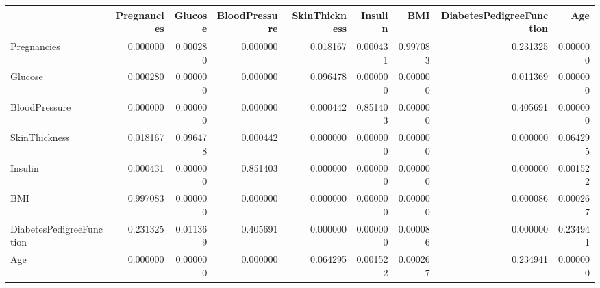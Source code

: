 \begin{tabular}{lrrrrrrrr}
\toprule
 & Pregnancies & Glucose & BloodPressure & SkinThickness & Insulin & BMI & DiabetesPedigreeFunction & Age \\
\midrule
Pregnancies & 0.000000 & 0.000280 & 0.000000 & 0.018167 & 0.000431 & 0.997083 & 0.231325 & 0.000000 \\
Glucose & 0.000280 & 0.000000 & 0.000000 & 0.096478 & 0.000000 & 0.000000 & 0.011369 & 0.000000 \\
BloodPressure & 0.000000 & 0.000000 & 0.000000 & 0.000442 & 0.851403 & 0.000000 & 0.405691 & 0.000000 \\
SkinThickness & 0.018167 & 0.096478 & 0.000442 & 0.000000 & 0.000000 & 0.000000 & 0.000000 & 0.064295 \\
Insulin & 0.000431 & 0.000000 & 0.851403 & 0.000000 & 0.000000 & 0.000000 & 0.000000 & 0.001522 \\
BMI & 0.997083 & 0.000000 & 0.000000 & 0.000000 & 0.000000 & 0.000000 & 0.000086 & 0.000267 \\
DiabetesPedigreeFunction & 0.231325 & 0.011369 & 0.405691 & 0.000000 & 0.000000 & 0.000086 & 0.000000 & 0.234941 \\
Age & 0.000000 & 0.000000 & 0.000000 & 0.064295 & 0.001522 & 0.000267 & 0.234941 & 0.000000 \\
\bottomrule
\end{tabular}
